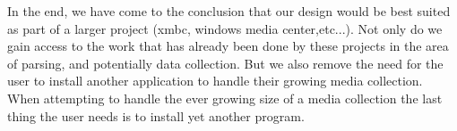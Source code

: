 \documentclass{acm_proc_article-sp}
\begin{document}
    In the end, we have come to the conclusion that our design would be best suited as part of a larger project (xmbc, windows media center,etc...). Not only do we gain access to the work that has already been done by these projects in the area of parsing, and potentially data collection. But we also remove the need for the user to install another application to handle their growing media collection. When attempting to handle the ever growing size of a media collection  the last thing the user needs is to install yet another program. 


\end{document}
